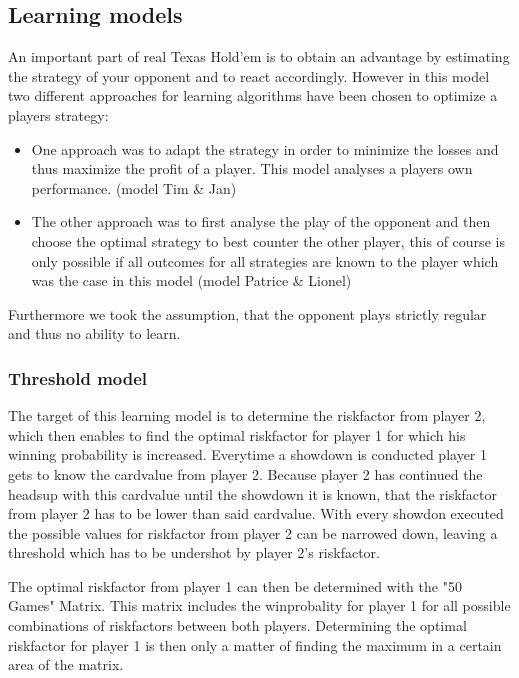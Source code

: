 \documentclass[11pt]{article}
\begin{document}
\subsection{Learning models}
An important part of real Texas Hold’em is to obtain an advantage by estimating the strategy of your opponent and to react accordingly.
However in this model two different approaches for learning algorithms have been chosen to optimize a players strategy:
\begin{itemize}
\item One approach was to adapt the strategy in order to minimize the losses and thus maximize the profit of a player. This model analyses a players own performance. (model Tim \& Jan)%
\item  The other approach was to first analyse the play of the opponent and then choose the optimal strategy to best counter the other player, this of course is only possible if all outcomes for all strategies are known to the player which was the case in this model (model Patrice \& Lionel)\\
\end{itemize}
Furthermore we took the assumption, that the opponent plays strictly regular and thus no ability to learn.

\subsubsection{Threshold model}

The target of this learning model is to determine the riskfactor from player 2, which then enables to find the optimal riskfactor for player 1 for which his winning probability is increased.
Everytime a showdown is conducted player 1 gets to know the cardvalue from player 2. Because player 2 has continued the headsup with this cardvalue until the showdown it is known, that the riskfactor from player 2 has to be lower than said cardvalue. With every showdon executed the possible values for riskfactor from player 2 can be narrowed down, leaving a threshold which has to be undershot by player 2's riskfactor.


The optimal riskfactor from player 1 can then be determined with the "50 Games" Matrix. This matrix includes the winprobality for player 1 for all possible combinations of riskfactors between both players. Determining the optimal riskfactor for player 1 is then only a matter of finding the maximum in a certain area of the matrix.
\end{document}
